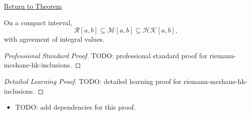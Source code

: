 \newpage
{}
\label{prf:riemann-mcshane-hk-inclusions}
\begin{remark*}[Return]\hyperref[thm:riemann-mcshane-hk-inclusions]{Return to Theorem}\end{remark*}

\begin{theorem*}
On a compact interval,
\[
  \mathcal R[a,b]\subseteq \mathcal M[a,b]\subseteq \mathcal{HK}[a,b],
\]
with agreement of integral values.
\end{theorem*}

\begin{proof}[Professional Standard Proof]
\LRAProofBodyStart
TODO: professional standard proof for riemann-mcshane-hk-inclusions.
\end{proof}

\begin{proof}[Detailed Learning Proof]
\LRAProofBodyStart
TODO: detailed learning proof for riemann-mcshane-hk-inclusions.
\end{proof}

\begin{remark*}
\end{remark*}

\begin{dependencies}
\begin{itemize}
  \item TODO: add dependencies for this proof.
\end{itemize}
\end{dependencies}

\clearpage
